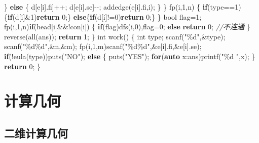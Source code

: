 \documentclass[
]{article}
\newenvironment{Shaded}{}{}
\newcommand{\CommentTok}[1]{\textcolor[rgb]{0.38,0.63,0.69}{\textit{#1}}}
\newcommand{\ControlFlowTok}[1]{\textcolor[rgb]{0.00,0.44,0.13}{\textbf{#1}}}
\newcommand{\DataTypeTok}[1]{\textcolor[rgb]{0.56,0.13,0.00}{#1}}
\newcommand{\DecValTok}[1]{\textcolor[rgb]{0.25,0.63,0.44}{#1}}
\newcommand{\KeywordTok}[1]{\textcolor[rgb]{0.00,0.44,0.13}{\textbf{#1}}}
\newcommand{\NormalTok}[1]{#1}
\newcommand{\SpecialCharTok}[1]{\textcolor[rgb]{0.25,0.44,0.63}{#1}}
\newcommand{\StringTok}[1]{\textcolor[rgb]{0.25,0.44,0.63}{#1}}
\begin{document}
\begin{Shaded}
\begin{Highlighting}[]
\NormalTok{        \}}
        \ControlFlowTok{else}
\NormalTok{        \{}
\NormalTok{            d[e[i].fi]++;}
\NormalTok{            d[e[i].se]{-}{-};}
\NormalTok{            addedge(e[i].fi,i);}
\NormalTok{        \}}
\NormalTok{    \}}
\NormalTok{    fp(i,}\DecValTok{1}\NormalTok{,n)}
\NormalTok{    \{}
        \ControlFlowTok{if}\NormalTok{(type==}\DecValTok{1}\NormalTok{)\{}\ControlFlowTok{if}\NormalTok{(d[i]\&}\DecValTok{1}\NormalTok{)}\ControlFlowTok{return} \DecValTok{0}\NormalTok{;\}}
        \ControlFlowTok{else}\NormalTok{\{}\ControlFlowTok{if}\NormalTok{(d[i]!=}\DecValTok{0}\NormalTok{)}\ControlFlowTok{return} \DecValTok{0}\NormalTok{;\}}
\NormalTok{    \}}
    \DataTypeTok{bool}\NormalTok{ flag=}\DecValTok{1}\NormalTok{;}
\NormalTok{    fp(i,}\DecValTok{1}\NormalTok{,n)}\ControlFlowTok{if}\NormalTok{(head[i]\&\&!con[i])}
\NormalTok{    \{}
        \ControlFlowTok{if}\NormalTok{(flag)dfs(i,}\DecValTok{0}\NormalTok{),flag=}\DecValTok{0}\NormalTok{;}
        \ControlFlowTok{else} \ControlFlowTok{return} \DecValTok{0}\NormalTok{; }\CommentTok{//不连通}
\NormalTok{    \}}
\NormalTok{    reverse(all(ans));}
    \ControlFlowTok{return} \DecValTok{1}\NormalTok{;}
\NormalTok{\}}
\DataTypeTok{int}\NormalTok{ work()}
\NormalTok{\{}
    \DataTypeTok{int}\NormalTok{ type;}
\NormalTok{    scanf(}\StringTok{"}\SpecialCharTok{\%d}\StringTok{"}\NormalTok{,\&type);}
\NormalTok{    scanf(}\StringTok{"}\SpecialCharTok{\%d\%d}\StringTok{"}\NormalTok{,\&n,\&m);}
\NormalTok{    fp(i,}\DecValTok{1}\NormalTok{,m)scanf(}\StringTok{"}\SpecialCharTok{\%d\%d}\StringTok{"}\NormalTok{,\&e[i].fi,\&e[i].se);}
    \ControlFlowTok{if}\NormalTok{(!eula(type))puts(}\StringTok{"NO"}\NormalTok{);}
    \ControlFlowTok{else}
\NormalTok{    \{}
\NormalTok{        puts(}\StringTok{"YES"}\NormalTok{);}
        \ControlFlowTok{for}\NormalTok{(}\KeywordTok{auto}\NormalTok{ x:ans)printf(}\StringTok{"}\SpecialCharTok{\%d}\StringTok{ "}\NormalTok{,x);}
\NormalTok{    \}}
    \ControlFlowTok{return} \DecValTok{0}\NormalTok{;}
\NormalTok{\}}
\end{Highlighting}
\end{Shaded}

\hypertarget{ux8ba1ux7b97ux51e0ux4f55}{%
\section{计算几何}\label{ux8ba1ux7b97ux51e0ux4f55}}

\hypertarget{ux4e8cux7ef4ux8ba1ux7b97ux51e0ux4f55}{%
\subsection{二维计算几何}\label{ux4e8cux7ef4ux8ba1ux7b97ux51e0ux4f55}}
\end{document}
